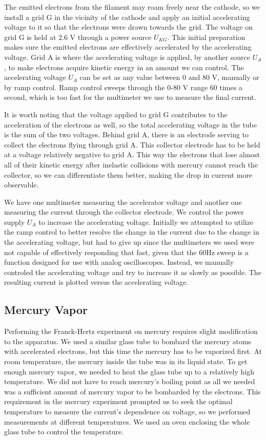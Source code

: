 \documentclass[prb,preprint]{revtex4-1}
\begin{document}
The emitted electrons from the filament may roam freely near the cathode, so we install a grid G in the vicinity of the cathode and apply an initial accelerating voltage to it so that the electrons were drawn towards the grid. The voltage on grid G is held at 2.6 V through a power source $U_{KG}$. This initial preparation makes sure the emitted electrons are effectively accelerated by the accelerating voltage. Grid A is where the accelerating voltage is applied, by another source $U_{A}$, to make electrons acquire kinetic energy in an amount we can control. The accelerating voltage $U_{A}$ can be set as any value between 0 and 80 V, manually or by ramp control. Ramp control sweeps through the 0-80 V range 60 times a second, which is too fast for the multimeter we use to measure the final current.

It is worth noting that the voltage applied to grid G contributes to the acceleration of the electrons as well, so the total accelerating voltage in the tube is the sum of the two voltages. Behind grid A, there is an electrode serving to collect the electrons flying through grid A. This collector electrode has to be held at a voltage relatively negative to grid A. This way the electrons that lose almost all of their kinetic energy after inelastic collisions with mercury cannot reach the collector, so we can differentiate them better, making the drop in current more observable.

We have one multimeter measuring the accelerator voltage and another one measuring the current through the collector electrode. We control the power supply $U_{A}$ to increase the accelerating voltage. Initially we attempted to utilize the ramp control to better resolve the change in the current due to the change in the accelerating voltage, but had to give up since the multimeters we used were not capable of effectively responding that fast, given that the 60Hz sweep is a function designed for use with analog oscilloscopes. Instead, we manually controled the accelerating voltage and try to increase it as slowly as possible. The resulting current is plotted versus the accelerating voltage.

\subsection{Mercury Vapor}

Performing the Franck-Hertz experiment on mercury requires slight modification to the apparatus. We used a similar glass tube to bombard the mercury atoms with accelerated electrons, but this time the mercury has to be vaporized first. At room temperature, the mercury inside the tube was in its liquid state. To get enough mercury vapor, we needed to heat the glass tube up to a relatively high temperature. We did not have to reach mercury's boiling point as all we needed was a sufficient amount of mercury vapor to be bombarded by the electrons. This requirement in the mercury experiment prompted us to seek the optimal temperature to measure the current's dependence on voltage, so we performed measurements at different temperatures. We used an oven enclosing the whole glass tube to control the temperature.
\end{document}
